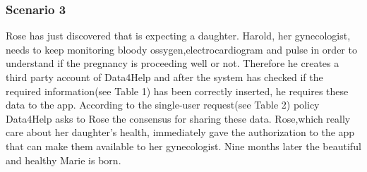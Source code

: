 \subsubsection{Scenario 3}
Rose has just discovered that is expecting a daughter. Harold, her gynecologist, needs to keep monitoring bloody ossygen,electrocardiogram and pulse in order to understand if the pregnancy is proceeding well or not. Therefore he creates a third party account of Data4Help and after the system has checked if the required information(see Table 1) has been correctly inserted, he requires these data to the app. According to the single-user request(see Table 2)  policy Data4Help asks to Rose the consensus for sharing these data. Rose,which really care about her daughter's health, immediately gave the authorization to the app that can make them available to her gynecologist. Nine months later the beautiful and healthy Marie is born.

